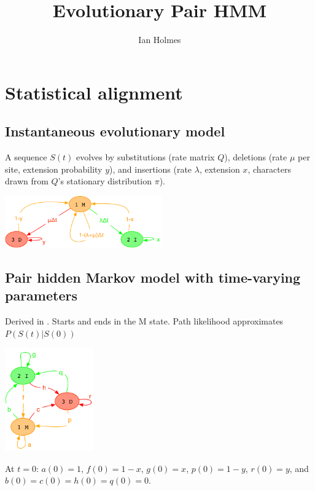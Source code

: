 \documentclass{article}
\title{Evolutionary Pair HMM}
\author{Ian Holmes}
\begin{document}

\section{Statistical alignment}

\subsection{Instantaneous evolutionary model}

A sequence $S(t)$ evolves by
substitutions (rate matrix $Q$),
deletions (rate $\mu$ per site, extension probability $y$),
and
insertions (rate $\lambda$, extension $x$,
characters drawn from $Q$'s stationary distribution $\pi$).

\includegraphics[height=6em]{InstantHMM.pdf}


\subsection{Pair hidden Markov model with time-varying parameters}
Derived in \cite{Holmes2020}.
Starts and ends in the M state.
Path likelihood approximates $P(S(t)|S(0))$

\includegraphics[height=12em]{PairHMM.pdf}

At $t=0$: $a(0)=1$, $f(0)=1-x$, $g(0)=x$, $p(0)=1-y$, $r(0)=y$, and $b(0)=c(0)=h(0)=q(0)=0$.
\end{document}
